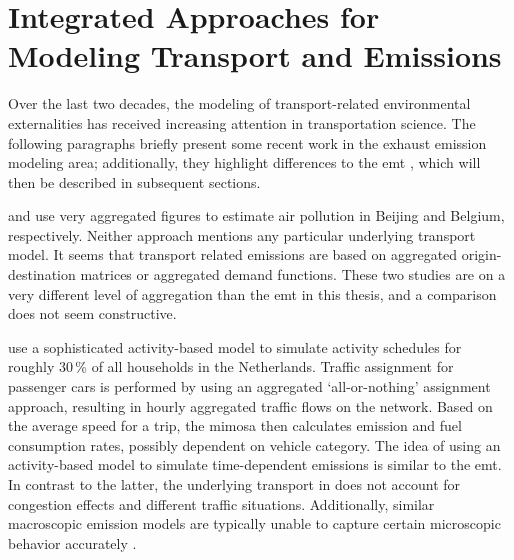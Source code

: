 \section{Integrated Approaches for Modeling Transport and Emissions}
\label{ch:emissions:relatedWork}
%
%
Over the last two decades, the modeling of transport-related environmental 
externalities has received increasing attention in transportation science.
%
The following paragraphs briefly present some recent 
work in the exhaust emission modeling area; additionally, they 
highlight differences to the \gls{emt} , which will then be described in 
subsequent sections.

\citet{CreutzigHe_TransResD_2009} and \citet{MichielsEtAl_TransResD_2012} use very 
aggregated figures to estimate air pollution in Beijing and Belgium, 
respectively. Neither approach mentions any particular underlying 
transport model. It seems that transport related emissions are based on
aggregated origin-destination matrices or aggregated demand functions. These 
two studies are on a very different level of aggregation than the \gls{emt} in 
this thesis, and a comparison does not seem constructive.

\citet{BeckxEtAl_EnvPlannB_2009} use a sophisticated 
activity-based model to simulate activity schedules for roughly 30\,\% of all 
households in the Netherlands. Traffic assignment for passenger cars is 
performed by using an aggregated `all-or-nothing' assignment approach, 
resulting in hourly aggregated traffic flows on the network. Based on the 
average speed for a trip, the \gls{mimosa} then 
calculates emission and fuel consumption rates, possibly dependent on vehicle 
category. The idea of using an activity-based model to simulate 
time-dependent emissions is similar to the \gls{emt}. In contrast to the 
latter, the underlying transport in \citet{BeckxEtAl_EnvPlannB_2009} 
does not account for congestion effects and different traffic situations. 
Additionally, similar macroscopic emission models are typically unable to 
capture certain microscopic behavior accurately 
\citep[see, e.g.,][]{AhnRakha_TransResD_2008}. 

